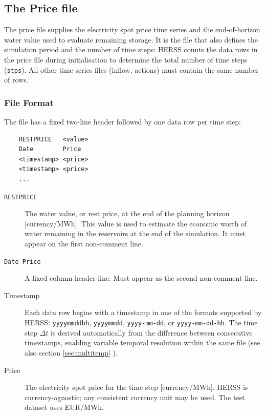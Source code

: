 \documentclass[a4paper, 12pt]{report}
\begin{document}
	\subsection{The Price file}
	\label{sec:pricefile}

	The price file supplies the electricity spot price time series and the end-of-horizon
	water value used to evaluate remaining storage. It is the file that also defines the
	simulation period and the number of time steps: HERSS counts the data rows in the price
	file during initialisation to determine the total number of time steps (\texttt{stps}).
	All other time series files (inflow, actions) must contain the same number of rows.

	\subsubsection{File Format}

	The file has a fixed two-line header followed by one data row per time step:

	\begin{verbatim}
	RESTPRICE   <value>
	Date        Price
	<timestamp> <price>
	<timestamp> <price>
	...
	\end{verbatim}

	\begin{description}
	\item[\texttt{RESTPRICE}] The water value, or rest price, at the end of the
	planning horizon [currency/MWh]. This value is used to estimate the economic
	worth of water remaining in the reservoirs at the end of the simulation.
	It must appear on the first non-comment line.
	
	\item[\texttt{Date Price}] A fixed column header line. Must appear as the second
	non-comment line.
	
	\item[Timestamp] Each data row begins with a timestamp in one of the formats
	supported by HERSS: \texttt{yyyymmddhh}, \texttt{yyyymmdd}, \texttt{yyyy-mm-dd},
	or \texttt{yyyy-mm-dd-hh}. The time step $\Delta t$ is derived automatically
	from the difference between consecutive timestamps, enabling variable temporal
	resolution within the same file (see also section \ref{sec:multitemp} ).
	
	\item[Price] The electricity spot price for the time step [currency/MWh]. HERSS is
	currency-agnostic; any consistent currency unit may be used. The test dataset
	uses EUR/MWh.
	\end{description}
\end{document}
